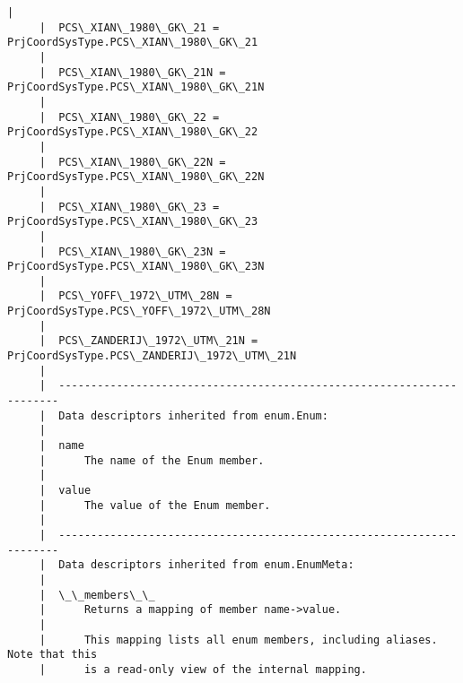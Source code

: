 \documentclass[11pt]{article}
\begin{document}
\begin{Verbatim}[commandchars=\\\{\}]
     |  
     |  PCS\_XIAN\_1980\_GK\_21 = PrjCoordSysType.PCS\_XIAN\_1980\_GK\_21
     |  
     |  PCS\_XIAN\_1980\_GK\_21N = PrjCoordSysType.PCS\_XIAN\_1980\_GK\_21N
     |  
     |  PCS\_XIAN\_1980\_GK\_22 = PrjCoordSysType.PCS\_XIAN\_1980\_GK\_22
     |  
     |  PCS\_XIAN\_1980\_GK\_22N = PrjCoordSysType.PCS\_XIAN\_1980\_GK\_22N
     |  
     |  PCS\_XIAN\_1980\_GK\_23 = PrjCoordSysType.PCS\_XIAN\_1980\_GK\_23
     |  
     |  PCS\_XIAN\_1980\_GK\_23N = PrjCoordSysType.PCS\_XIAN\_1980\_GK\_23N
     |  
     |  PCS\_YOFF\_1972\_UTM\_28N = PrjCoordSysType.PCS\_YOFF\_1972\_UTM\_28N
     |  
     |  PCS\_ZANDERIJ\_1972\_UTM\_21N = PrjCoordSysType.PCS\_ZANDERIJ\_1972\_UTM\_21N
     |  
     |  ----------------------------------------------------------------------
     |  Data descriptors inherited from enum.Enum:
     |  
     |  name
     |      The name of the Enum member.
     |  
     |  value
     |      The value of the Enum member.
     |  
     |  ----------------------------------------------------------------------
     |  Data descriptors inherited from enum.EnumMeta:
     |  
     |  \_\_members\_\_
     |      Returns a mapping of member name->value.
     |      
     |      This mapping lists all enum members, including aliases. Note that this
     |      is a read-only view of the internal mapping.
    

\end{Verbatim}
\end{document}
